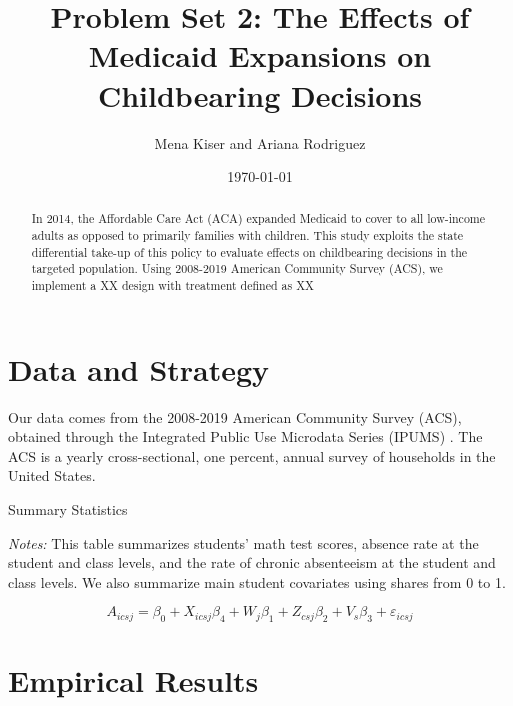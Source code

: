 \documentclass{article}
\title{Problem Set 2: The Effects of Medicaid Expansions on Childbearing Decisions}
\author{Mena Kiser and Ariana Rodriguez}
\date{\today}
\begin{document}
\maketitle

\begin{abstract}
    In 2014, the Affordable Care Act (ACA) expanded Medicaid to cover to all low-income adults as opposed to primarily families with children. This study exploits the state differential take-up of this policy to evaluate effects on childbearing decisions in the targeted population. Using 2008-2019 American Community Survey (ACS), we implement a XX design with treatment defined as XX
\end{abstract}

\section{Data and Strategy}
Our data comes from the 2008-2019 American Community Survey (ACS), obtained through the Integrated Public Use Microdata Series (IPUMS) \citep{data:acs}. The ACS is a yearly cross-sectional, one percent, annual survey of households in the United States. 


\begin{table}[h!]
\begin{centering}
\singlespacing
\caption{Summary Statistics}
\label{tab:sumstat}
\end{centering}
\begin{spacing}{1}
\begin{footnotesize}

\textit{Notes:} This table summarizes students’ math test scores, absence rate at the student and class levels, and the rate of chronic absenteeism at the student and class levels. We also summarize main student covariates using shares from 0 to 1.
\end{footnotesize}
\end{spacing}
\end{table}


\begin{equation}
    A_{icsj} = \beta_0 + X_{icsj}\beta_4 + W_{j}\beta_1 + Z_{csj}\beta_2 + V_{s}\beta_3 + \varepsilon_{icsj}
\end{equation}


\section{Empirical Results}
\end{document}
